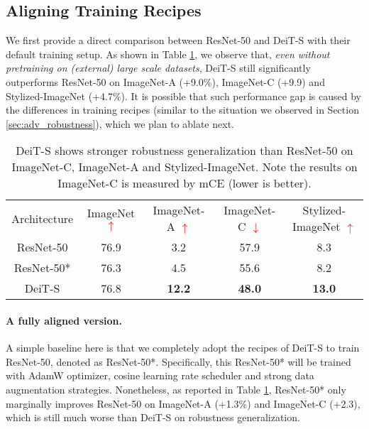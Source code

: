 \documentclass{article}
\begin{document}
\subsection{Aligning Training Recipes}
\label{sec:gene:align}
We first provide a direct comparison between ResNet-50 and DeiT-S with their default training setup. As shown in Table \ref{exp:orisetting}, we observe that, \emph{even without pretraining on (external) large scale datasets},  DeiT-S still significantly outperforms ResNet-50 on ImageNet-A (+9.0\%), ImageNet-C (+9.9) and Stylized-ImageNet (+4.7\%). It is possible that such performance gap is caused by the differences in training recipes (similar to the situation we observed in Section \ref{sec:adv_robustness}), 
which we plan to ablate next.


\begin{table}[h!]
\vspace{-0.3em}
\caption{DeiT-S shows stronger robustness generalization than ResNet-50 on ImageNet-C, ImageNet-A and Stylized-ImageNet. Note the results on ImageNet-C is measured by mCE (lower is better). }
\footnotesize
\centering
\begin{tabular}{c|c|c|c|c}
\shline
 Architecture & ImageNet \textcolor{red}{$\uparrow$} & ImageNet-A \textcolor{red}{$\uparrow$}& ImageNet-C \textcolor{red}{$\downarrow$}& Stylized-ImageNet \textcolor{red}{$\uparrow$} \\ \shline 
ResNet-50  &  76.9        &   3.2        &    57.9       &    8.3     \\ 

 ResNet-50*  &   76.3     &    4.5        &     55.6       &      8.2     \\ \hline 
 DeiT-S &  76.8        &   \textbf{12.2}         &     \textbf{48.0}       &   \textbf{13.0}    \\ \hline 
\end{tabular}
\label{exp:orisetting}
\vspace{-0.2em}
\end{table}



\paragraph{A fully aligned version.}
A simple baseline here is that we completely adopt the recipes of DeiT-S to train ResNet-50, denoted as ResNet-50*. Specifically, this ResNet-50* will be trained with AdamW optimizer, cosine learning rate scheduler and strong data augmentation strategies. Nonetheless, as reported in Table \ref{exp:orisetting}, ResNet-50* only marginally improves ResNet-50 on ImageNet-A (+1.3\%) and ImageNet-C (+2.3), which is still much worse than DeiT-S on robustness generalization.
\end{document}
